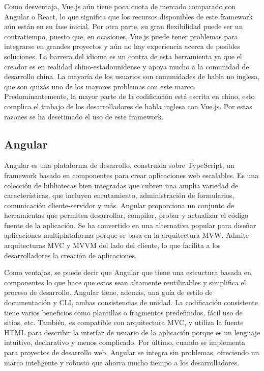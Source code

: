 Como desventaja, Vue.js a\'un tiene poca cuota de mercado comparado con Angular o React, lo que significa que los recursos disponibles de este framework a\'un est\'an en su fase inicial. Por otra parte, su gran flexibilidad puede ser un contratiempo, puesto que, en ocasiones, Vue.js puede tener problemas para integrarse en grandes proyectos y a\'un no hay experiencia acerca de posibles soluciones. La barrera del idioma es un contra de esta herramienta ya que el creador es en realidad chino-estadounidense y apoya mucho a la comunidad de desarrollo china. La mayor\'ia de los usuarios son comunidades de habla no inglesa, que son quiz\'as uno de los mayores problemas con este marco. Predominantemente, la mayor parte de la codificaci\'on est\'a escrita en chino, esto complica el trabajo de los desarrolladores de habla inglesa con Vue.js. Por estas razones se ha desetimado el uso de este framework.


\subsection{Angular}
Angular es una plataforma de desarrollo, construida sobre TypeScript, un framework basado en componentes para crear aplicaciones web escalables. Es una colecci\'on de bibliotecas bien integradas que cubren una amplia variedad de caracter\'isticas, que incluyen enrutamiento, administraci\'on de formularios, comunicaci\'on cliente-servidor y m\'as. Angular proporciona un conjunto de herramientas que permiten desarrollar, compilar, probar y actualizar el c\'odigo fuente de la aplicaci\'on. Se ha convertido en una alternativa popular para dise\~nar aplicaciones multiplataforma porque se basa en la arquitectura MVW. Admite arquitecturas MVC y MVVM del lado del cliente, lo que facilita a los desarrolladores la creaci\'on de aplicaciones.

Como ventajas, se puede decir que Angular que tiene una estructura basada en componentes lo que hace que estos sean altamente reutilizables y simplifica el proceso de desarrollo. Angular tiene, adem\'as, una gu\'ia de estilo de documentaci\'on y CLI, ambas consistencias de unidad. La codificaci\'on consistente tiene varios beneficios como plantillas o fragmentos predefinidos, f\'acil uso de sitios, etc. Tambi\'en, es compatible con arquitectura MVC, y utiliza la fuente HTML para describir la interfaz de usuario de la aplicaci\'on porque es un lenguaje intuitivo, declarativo y menos complicado. Por \'ultimo, cuando se implementa para proyectos de desarrollo web, Angular se integra sin problemas, ofreciendo un marco inteligente y robusto que ahorra mucho tiempo a los desarrolladores. 

